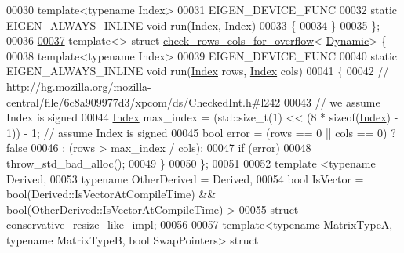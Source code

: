 \begin{DoxyCode}
00030   \textcolor{keyword}{template}<\textcolor{keyword}{typename} Index>
00031   EIGEN\_DEVICE\_FUNC
00032   \textcolor{keyword}{static} EIGEN\_ALWAYS\_INLINE \textcolor{keywordtype}{void} run(\hyperlink{namespace_eigen_a62e77e0933482dafde8fe197d9a2cfde}{Index}, \hyperlink{namespace_eigen_a62e77e0933482dafde8fe197d9a2cfde}{Index})
00033   \{
00034   \}
00035 \};
00036 
\hyperlink{struct_eigen_1_1internal_1_1check__rows__cols__for__overflow_3_01_dynamic_01_4}{00037} \textcolor{keyword}{template}<> \textcolor{keyword}{struct }\hyperlink{struct_eigen_1_1internal_1_1check__rows__cols__for__overflow}{check\_rows\_cols\_for\_overflow}<
      \hyperlink{namespace_eigen_ad81fa7195215a0ce30017dfac309f0b2}{Dynamic}> \{
00038   \textcolor{keyword}{template}<\textcolor{keyword}{typename} Index>
00039   EIGEN\_DEVICE\_FUNC
00040   \textcolor{keyword}{static} EIGEN\_ALWAYS\_INLINE \textcolor{keywordtype}{void} run(\hyperlink{namespace_eigen_a62e77e0933482dafde8fe197d9a2cfde}{Index} rows, \hyperlink{namespace_eigen_a62e77e0933482dafde8fe197d9a2cfde}{Index} cols)
00041   \{
00042     \textcolor{comment}{// http://hg.mozilla.org/mozilla-central/file/6c8a909977d3/xpcom/ds/CheckedInt.h#l242}
00043     \textcolor{comment}{// we assume Index is signed}
00044     \hyperlink{namespace_eigen_a62e77e0933482dafde8fe197d9a2cfde}{Index} max\_index = (std::size\_t(1) << (8 * \textcolor{keyword}{sizeof}(\hyperlink{namespace_eigen_a62e77e0933482dafde8fe197d9a2cfde}{Index}) - 1)) - 1; \textcolor{comment}{// assume Index is signed}
00045     \textcolor{keywordtype}{bool} error = (rows == 0 || cols == 0) ? \textcolor{keyword}{false}
00046                : (rows > max\_index / cols);
00047     \textcolor{keywordflow}{if} (error)
00048       throw\_std\_bad\_alloc();
00049   \}
00050 \};
00051 
00052 \textcolor{keyword}{template} <\textcolor{keyword}{typename} Derived,
00053           \textcolor{keyword}{typename} OtherDerived = Derived,
00054           \textcolor{keywordtype}{bool} IsVector = bool(Derived::IsVectorAtCompileTime) && bool(OtherDerived::IsVectorAtCompileTime)
      >
\hyperlink{struct_eigen_1_1internal_1_1conservative__resize__like__impl}{00055} \textcolor{keyword}{struct }\hyperlink{struct_eigen_1_1internal_1_1conservative__resize__like__impl}{conservative\_resize\_like\_impl};
00056 
\hyperlink{struct_eigen_1_1internal_1_1matrix__swap__impl}{00057} \textcolor{keyword}{template}<\textcolor{keyword}{typename} MatrixTypeA, \textcolor{keyword}{typename} MatrixTypeB, \textcolor{keywordtype}{bool} SwapPo\textcolor{keywordtype}{int}ers> \textcolor{keyword}{struct }

\end{DoxyCode}
